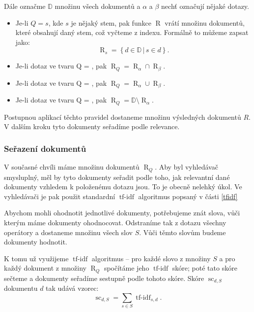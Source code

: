 \documentclass{article}
\newcommand{\sep}{\,|\,}
\newcommand{\sssection}[1]{\subsubsection{#1}}
\DeclareMathOperator{\tfidf}{tf-idf}
\DeclareMathOperator{\score}{sc}
\DeclareMathOperator{\getdocs}{R}
\newcommand{\alldoc}{\mathbb{D}}
\begin{document}
Dále označme $\alldoc$ množinu všech dokumentů a $\alpha$ a $\beta$ nechť označují nějaké dotazy. 

\begin{itemize}
\item Je-li $Q=s$, kde $s$ je nějaký stem, pak funkce $\getdocs$ vrátí množinu dokumentů, které obsahují daný stem, což vyčteme z indexu. Formálně to můžeme zapsat jako:
$$
\getdocs_s = \left\{d\in \alldoc\sep s\in d\right\}.
$$
\item Je-li dotaz ve tvaru Q = , pak $\getdocs_Q = \getdocs_\alpha \cap \getdocs_\beta$.
\item Je-li dotaz ve tvaru Q = , pak $\getdocs_Q = \getdocs_\alpha \cup \getdocs_\beta$.
\item Je-li dotaz ve tvaru Q = , pak $\getdocs_Q = \alldoc\setminus\getdocs_\alpha$.
\end{itemize}

Postupnou aplikací těchto pravidel dostaneme množinu výsledných dokumentů $R$. V dalším kroku tyto dokumenty seřadíme podle relevance. 

\sssection{Seřazení dokumentů}

V současné chvíli máme množinu dokumentů $\getdocs_Q$. Aby byl vyhledávač smysluplný, měl by tyto dokumenty seřadit podle toho, jak relevantní dané dokumenty vzhledem k položenému dotazu jsou. To je obecně nelehký úkol. Ve vyhledávači je pak použit standardní $\tfidf$ algoritmus popsaný v části \ref{tfidf}


Abychom mohli ohodnotit jednotlivé dokumenty, potřebujeme znát slova, vůči kterým máme dokumenty ohodnocovat. Odstraníme tak z dotazu všechny operátory a dostaneme množinu všech slov $S$. Vůči těmto slovům budeme dokumenty hodnotit. 

K tomu už využijeme $\tfidf$ algoritmus -- pro každé slovo z množiny $S$ a pro každý dokument z množiny $\getdocs_Q$ spočítáme jeho $\tfidf$ skóre; poté tato skóre sečteme a dokumenty seřadíme sestupně podle tohoto skóre. Skóre $\score_{d,S}$ dokumentu $d$ tak udává vzorec:
$$\score_{d,S}=\sum_{s\in S} \tfidf_{s, d}.$$
\end{document}
